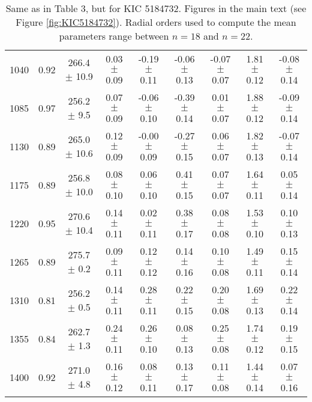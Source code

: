 \documentclass[twocolumn]{aastex61}%
\begin{document}
\begin{table*}[ht]
\begin{tabular}{ccc|ccccc|c}
1040 & 0.92 & 266.4 $\pm$ 10.9 & 0.03 $\pm$ 0.09 & -0.19 $\pm$ 0.11 & -0.06 $\pm$ 0.13 & -0.07 $\pm$ 0.07 & 1.81 $\pm$ 0.12 & -0.08 $\pm$ 0.14\\
1085 & 0.97 & 256.2 $\pm$ 9.5 & 0.07 $\pm$ 0.09 & -0.06 $\pm$ 0.10 & -0.39 $\pm$ 0.14 & 0.01 $\pm$ 0.07 & 1.88 $\pm$ 0.12 & -0.09 $\pm$ 0.14\\
1130 & 0.89 & 265.0 $\pm$ 10.6 & 0.12 $\pm$ 0.09 & -0.00 $\pm$ 0.09 & -0.27 $\pm$ 0.15 & 0.06 $\pm$ 0.07 & 1.82 $\pm$ 0.13 & -0.07 $\pm$ 0.14\\
1175 & 0.89 & 256.8 $\pm$ 10.0 & 0.08 $\pm$ 0.10 & 0.06 $\pm$ 0.10 & 0.41 $\pm$ 0.15 & 0.07 $\pm$ 0.07 & 1.64 $\pm$ 0.11 & 0.05 $\pm$ 0.14\\
1220 & 0.95 & 270.6 $\pm$ 10.4 & 0.14 $\pm$ 0.11 & 0.02 $\pm$ 0.11 & 0.38 $\pm$ 0.17 & 0.08 $\pm$ 0.08 & 1.53 $\pm$ 0.10 & 0.10 $\pm$ 0.13\\
1265 & 0.89 & 275.7 $\pm$ 0.2 & 0.09 $\pm$ 0.11 & 0.12 $\pm$ 0.12 & 0.14 $\pm$ 0.16 & 0.10 $\pm$ 0.08 & 1.49 $\pm$ 0.11 & 0.15 $\pm$ 0.14\\
1310 & 0.81 & 256.2 $\pm$ 0.5 & 0.14 $\pm$ 0.11 & 0.28 $\pm$ 0.11 & 0.22 $\pm$ 0.15 & 0.20 $\pm$ 0.08 & 1.69 $\pm$ 0.13 & 0.22 $\pm$ 0.14\\
1355 & 0.84 & 262.7 $\pm$ 1.3 & 0.24 $\pm$ 0.11 & 0.26 $\pm$ 0.10 & 0.08 $\pm$ 0.13 & 0.25 $\pm$ 0.08 & 1.74 $\pm$ 0.12 & 0.19 $\pm$ 0.15\\
1400 & 0.92 & 271.0 $\pm$ 4.8 & 0.16 $\pm$ 0.12 & 0.08 $\pm$ 0.11 & 0.13 $\pm$ 0.17 & 0.11 $\pm$ 0.08 & 1.44 $\pm$ 0.14 & 0.07 $\pm$ 0.16\\
\end{tabular}
\caption{Same as in Table 3, but for KIC 5184732. Figures in the main text (see Figure \ref{fig:KIC5184732}). Radial orders used to compute the mean parameters range between $n=18$ and $n=22$.}\label{tab:5184732}
\end{table*}

\nopagebreak
\FloatBarrier
\nopagebreak
\end{document}
